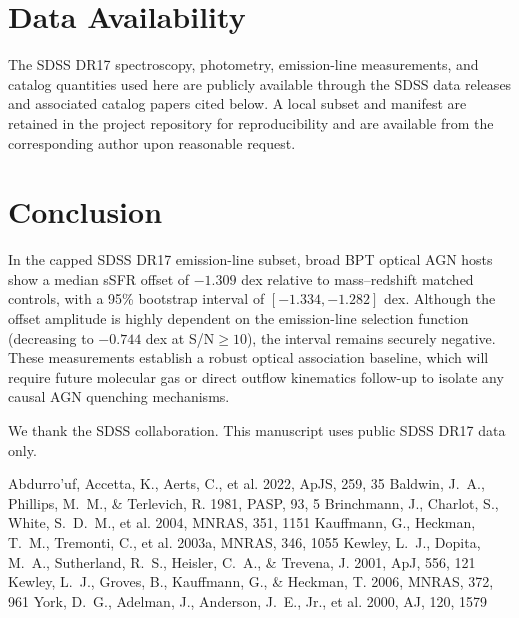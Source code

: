 \documentclass[twocolumn]{aastex631}
\begin{document}
\section{Data Availability}\label{sec:data-avail}
The SDSS DR17 spectroscopy, photometry, emission-line measurements, and catalog quantities used here are publicly available through the SDSS data releases and associated catalog papers cited below. A local subset and manifest are retained in the project repository for reproducibility and are available from the corresponding author upon reasonable request.

\section{Conclusion}\label{sec:conclusion}
In the capped SDSS DR17 emission-line subset, broad BPT optical AGN hosts show a median sSFR offset of $-1.309$ dex relative to mass--redshift matched controls, with a 95\% bootstrap interval of $[-1.334,-1.282]$ dex. Although the offset amplitude is highly dependent on the emission-line selection function (decreasing to $-0.744$ dex at S/N$\geq 10$), the interval remains securely negative. These measurements establish a robust optical association baseline, which will require future molecular gas or direct outflow kinematics follow-up to isolate any causal AGN quenching mechanisms.

\acknowledgments
We thank the SDSS collaboration. This manuscript uses public SDSS DR17 data only.


\begin{thebibliography}{}
 Abdurro'uf, Accetta, K., Aerts, C., et al. 2022, ApJS, 259, 35
 Baldwin, J.~A., Phillips, M.~M., \& Terlevich, R. 1981, PASP, 93, 5
 Brinchmann, J., Charlot, S., White, S.~D.~M., et al. 2004, MNRAS, 351, 1151
 Kauffmann, G., Heckman, T.~M., Tremonti, C., et al. 2003a, MNRAS, 346, 1055
 Kewley, L.~J., Dopita, M.~A., Sutherland, R.~S., Heisler, C.~A., \& Trevena, J. 2001, ApJ, 556, 121
 Kewley, L.~J., Groves, B., Kauffmann, G., \& Heckman, T. 2006, MNRAS, 372, 961
 York, D.~G., Adelman, J., Anderson, J.~E., Jr., et al. 2000, AJ, 120, 1579

\end{thebibliography}
\end{document}
